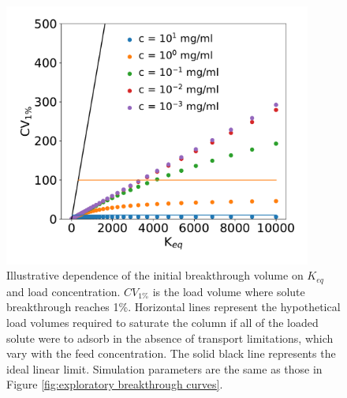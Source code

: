 \documentclass[11pt,a4paper]{article}
\providecommand{\DIFaddtex}[1]{{\sf #1}} %
\providecommand{\DIFaddFL}[1]{\DIFadd{#1}} %
\providecommand{\DIFaddbeginFL}{} %
\providecommand{\DIFaddendFL}{} %
\providecommand{\DIFdelbeginFL}{} %
\providecommand{\DIFdelendFL}{} %
\providecommand{\DIFadd}[1]{\texorpdfstring{\DIFaddtex{#1}}{#1}} %
\begin{document}
\begin{figure}[bp]
    \centering
    \DIFdelbeginFL %
\DIFdelendFL \DIFaddbeginFL \includegraphics[width=0.9\textwidth]{figure_2}
    \DIFaddendFL \caption{Illustrative dependence of the initial breakthrough volume on $K_{eq}$ and load concentration. $CV_{1\%}$ is the load volume where solute breakthrough reaches 1\%. Horizontal lines represent the hypothetical load volumes required to saturate the column \DIFaddbeginFL \DIFaddFL{if all of the loaded solute were to adsorb in the absence of transport limitations}\DIFaddendFL , which vary with the feed concentration. The solid black line represents the ideal linear limit. \DIFaddbeginFL \DIFaddFL{Simulation parameters are the same as those in Figure \ref{fig:exploratory breakthrough curves}.}\DIFaddendFL }
    \label{fig:initial breakthrough volumes vs Keq}
\end{figure}
\end{document}
